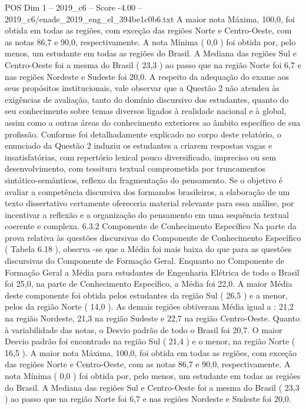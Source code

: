 \begin{textsample}{POS Dim 1 – 2019\_c6 – Score -4.00 – 2019\_c6/enade\_2019\_eng\_el\_394be1c0b6.txt}
A maior nota Máxima, 100,0, foi obtida em todas as regiões, com exceção das regiões Norte e Centro-Oeste, com as notas 86,7 e 90,0, respectivamente.
A nota Mínima ( 0,0 ) foi obtida por, pelo menos, um estudante em todas as regiões do Brasil.
A Mediana das regiões Sul e Centro-Oeste foi a mesma do Brasil ( 23,3 ) ao passo que na região Norte foi 6,7 e nas regiões Nordeste e Sudeste foi 20,0.
A respeito da adequação do exame aos seus propósitos institucionais, vale observar que a Questão 2 não atendeu às exigências de avaliação, tanto do domínio discursivo dos estudantes, quanto do seu conhecimento sobre temas diversos ligados à realidade nacional e à global, assim como a outras áreas do conhecimento exteriores ao âmbito específico de sua profissão.
Conforme foi detalhadamente explicado no corpo deste relatório, o enunciado da Questão 2 induziu os estudantes a criarem respostas vagas e insatisfatórias, com repertório lexical pouco diversificado, impreciso ou sem desenvolvimento, com tessitura textual comprometida por truncamentos sintático-semânticos, reflexo da fragmentação do pensamento.
Se o objetivo é avaliar a competência discursiva dos formandos brasileiros, a elaboração de um texto dissertativo certamente ofereceria material relevante para essa análise, por incentivar a reflexão e a organização do pensamento em uma sequência textual coerente e complexa. 6.3.2 Componente de Conhecimento Específico Na parte da prova relativa às questões discursivas do Componente de Conhecimento Específico ( Tabela 6.18 ), observa -se que a Média foi mais baixa do que para as questões discursivas do Componente de Formação Geral.
Enquanto no Componente de Formação Geral a Média para estudantes de Engenharia Elétrica de todo o Brasil foi 25,0, na parte de Conhecimento Específico, a Média foi 22,0.
A maior Média deste componente foi obtida pelos estudantes da região Sul ( 26,5 ) e a menor, pelos da região Norte ( 14,0 ).
As demais regiões obtiveram Média igual a : 21,2 na região Nordeste, 21,3 na região Sudeste e 22,7 na região Centro-Oeste.
Quanto à variabilidade das notas, o Desvio padrão de todo o Brasil foi 20,7.
O maior Desvio padrão foi encontrado na região Sul ( 21,4 ) e o menor, na região Norte ( 16,5 ).
A maior nota Máxima, 100,0, foi obtida em todas as regiões, com exceção das regiões Norte e Centro-Oeste, com as notas 86,7 e 90,0, respectivamente.
A nota Mínima ( 0,0 ) foi obtida por, pelo menos, um estudante em todas as regiões do Brasil.
A Mediana das regiões Sul e Centro-Oeste foi a mesma do Brasil ( 23,3 ) ao passo que na região Norte foi 6,7 e nas regiões Nordeste e Sudeste foi 20,0.

\end{textsample}
